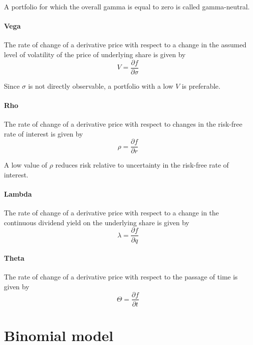 \documentclass[11pt,a4paper]{book}
\theoremstyle{definition}\newtheorem{definition}{Definition}
\theoremstyle{definition}\newtheorem{fact}{Fact}
\theoremstyle{definition}\newtheorem{remark}{Remark}
\theoremstyle{definition}\newtheorem{ex}{Ex.}
\theoremstyle{definition}\newtheorem{project}{Project}
\theoremstyle{definition}\newtheorem{problem}{Problem}
\theoremstyle{definition}\newtheorem{example}{Example}
\numberwithin{theorem}{section}
\numberwithin{corollary}{chapter}
\numberwithin{assumption}{chapter}
\numberwithin{definition}{chapter}
\numberwithin{prop}{chapter}
\numberwithin{notation}{chapter}
\numberwithin{problem}{chapter}
\numberwithin{example}{chapter}
\numberwithin{fact}{chapter}
\numberwithin{ex}{chapter}
\begin{document}
A portfolio for which the overall gamma is equal to zero is called gamma-neutral.

\subsubsection*{Vega}

The rate of change of a derivative price with respect to a change in the assumed level of volatility of the price of underlying share is given by
\begin{equation}
V = \frac{\partial f}{\partial \sigma}
\end{equation}

Since $\sigma$ is not directly observable, a portfolio with a low $V$ is preferable.

\subsubsection*{Rho}

The rate of change of a derivative price with respect to changes in the risk-free rate of interest is given by
\begin{equation}
\rho = \frac{\partial f}{\partial r}
\end{equation}

A low value of $\rho$ reduces risk relative to uncertainty in the risk-free rate of interest.

\subsubsection*{Lambda}

The rate of change of a derivative price with respect to a change in the continuous dividend yield on the underlying share is given by
\begin{equation}
\lambda = \frac{\partial f}{\partial q}
\end{equation}

\subsubsection*{Theta}

The rate of change of a derivative price with respect to the passage of time is given by
\begin{equation}
\Theta = \frac{\partial f}{\partial t}
\end{equation}


\chapter{Binomial model}
\end{document}
